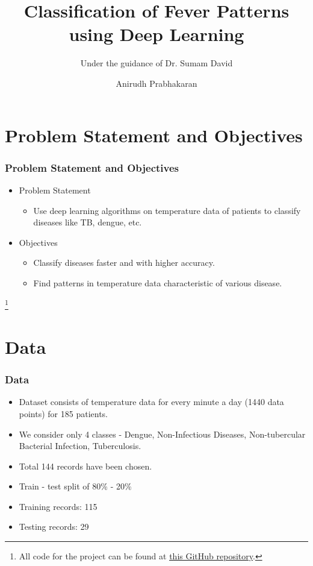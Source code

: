 \documentclass[pdf, 9pt]{beamer}
\title{Classification of Fever Patterns using Deep Learning}
\subtitle{Under the guidance of Dr. Sumam David}
\author{Anirudh Prabhakaran}
\institute{National Institute of Technology, Karnataka}
\newcommand\blfootnote[1]{%
	\begingroup
	\renewcommand\thefootnote{}\footnote{#1}%
	\addtocounter{footnote}{-1}%
	\endgroup
}
\begin{document}
	
	\begin{frame}
		\titlepage
	\end{frame}
	
	\section{Problem Statement and Objectives}
	\begin{frame}
		\frametitle{Problem Statement and Objectives}
		\begin{itemize}
			\item Problem Statement
			\begin{itemize}
				\item Use deep learning algorithms on temperature data of patients to classify diseases like TB, dengue, etc.
			\end{itemize}
			\item Objectives
			\begin{itemize}
				\item Classify diseases faster and with higher accuracy.
				\item Find patterns in temperature data characteristic of various disease.
			\end{itemize}
		\end{itemize}
		\blfootnote{All code for the project can be found at \href{https://github.com/anirudhprabhakaran3/diagnosis-temperature-data}{\underline{this GitHub repository}}.}
	\end{frame}
	
	\section{Data}
	\begin{frame}
		\frametitle{Data}
		\begin{itemize}
			\item Dataset consists of temperature data for every minute a day (1440 data points) for 185 patients.
			\item We consider only 4 classes - Dengue, Non-Infectious Diseases, Non-tubercular Bacterial Infection, Tuberculosis.
			\item Total 144 records have been chosen.
			\item Train - test split of 80\% - 20\%
			\item Training records: 115
			\item Testing records: 29
		\end{itemize}
	\end{frame}
	
\end{document}
